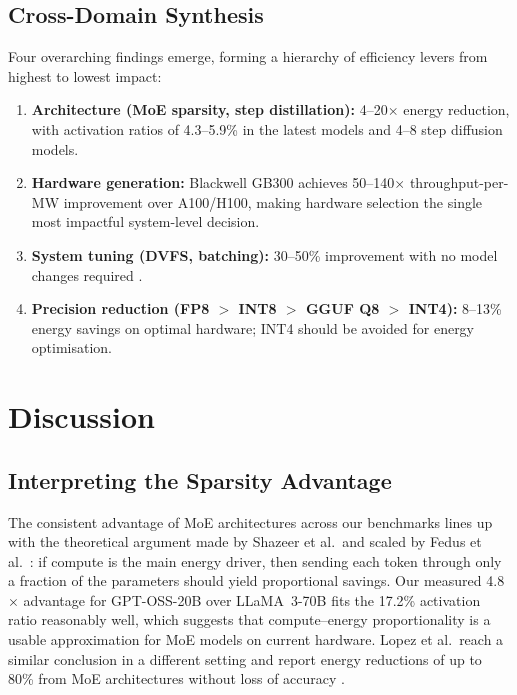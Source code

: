 \documentclass[AMS,STIX2COL]{WileyNJD-v2}
\begin{document}
\subsection{Cross-Domain Synthesis}

Four overarching findings emerge, forming a hierarchy of efficiency levers from highest to lowest impact:

\begin{enumerate}
\item \textbf{Architecture (MoE sparsity, step distillation):} 4--20$\times$ energy reduction, with activation ratios of 4.3--5.9\% in the latest models and 4--8 step diffusion models.
\item \textbf{Hardware generation:} Blackwell GB300 achieves 50--140$\times$ throughput-per-MW improvement over A100/H100, making hardware selection the single most impactful system-level decision.
\item \textbf{System tuning (DVFS, batching):} 30--50\% improvement with no model changes required \cite{maliakel2025dvfs}.
\item \textbf{Precision reduction (FP8 $>$ INT8 $>$ GGUF Q8 $>$ INT4):} 8--13\% energy savings on optimal hardware; INT4 should be avoided for energy optimisation.
\end{enumerate}


\section{Discussion}\label{sec5}

\subsection{Interpreting the Sparsity Advantage}

The consistent advantage of MoE architectures across our benchmarks lines up with the theoretical argument made by Shazeer et al.\ and scaled by Fedus et al.\ \cite{shazeer2017moe, fedus2022switch}: if compute is the main energy driver, then sending each token through only a fraction of the parameters should yield proportional savings. Our measured 4.8$\times$ advantage for GPT-OSS-20B over LLaMA~3-70B fits the 17.2\% activation ratio reasonably well, which suggests that compute--energy proportionality is a usable approximation for MoE models on current hardware. Lopez et al.\ reach a similar conclusion in a different setting and report energy reductions of up to 80\% from MoE architectures without loss of accuracy \cite{lopez2025moe}.
\end{document}
